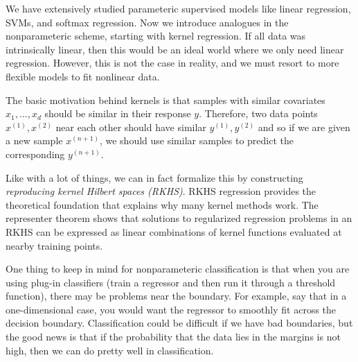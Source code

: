 We have extensively studied parameteric supervised models like linear regression, SVMs, and softmax regression. Now we introduce analogues in the nonparameteric scheme, starting with kernel regression. If all data was intrinsically linear, then this would be an ideal world where we only need linear regression. However, this is not the case in reality, and we must resort to more flexible models to fit nonlinear data. 

The basic motivation behind kernels is that samples with similar covariates $x_1, \ldots, x_d$ should be similar in their response $y$. Therefore, two data points $x^{(1)}, x^{(2)}$ near each other should have similar $y^{(1)}, y^{(2)}$ and so if we are given a new sample $x^{(n+1)}$, we should use similar samples to predict the corresponding $y^{(n+1)}$. 

Like with a lot of things, we can in fact formalize this by constructing \textit{reproducing kernel Hilbert spaces (RKHS)}. RKHS regression provides the theoretical foundation that explains why many kernel methods work. The representer theorem shows that solutions to regularized regression problems in an RKHS can be expressed as linear combinations of kernel functions evaluated at nearby training points. 

One thing to keep in mind for nonparameteric classification is that when you are using plug-in classifiers (train a regressor and then run it through a threshold function), there may be problems near the boundary. For example, say that in a one-dimensional case, you would want the regressor to smoothly fit across the decision boundary. Classification could be difficult if we have bad boundaries, but the good news is that if the probability that the data lies in the margins is not high, then we can do pretty well in classification. 

